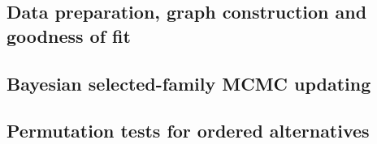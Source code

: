 \documentclass[11pt,a4paper]{article}
\begin{document}
\subsection{Data preparation, graph construction and goodness of fit}


\subsection{Bayesian selected-family MCMC updating}


\subsection{Permutation tests for ordered alternatives}

\end{document}
